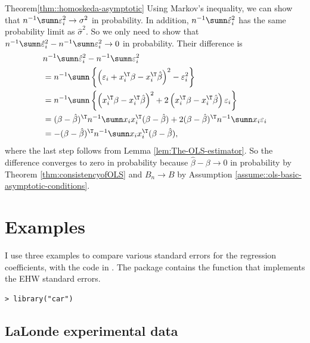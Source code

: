 \begin{myproof}{Theorem}{\ref{thm::homoskeda-asymptotic}}
Using Markov's inequality, we can show that $n^{-1}\sumn\varepsilon_{i}^{2}\rightarrow\sigma^{2}$ 
in probability. In addition, $n^{-1}\sumn\hat{\varepsilon}_{i}^{2}$ has the
same probability limit as $\hat{\sigma}^{2}$. So we only need to
show that $n^{-1}\sumn\hat{\varepsilon}_{i}^{2}-n^{-1}\sumn\varepsilon_{i}^{2}\rightarrow0$
in probability. Their difference is
\begin{align*}
&n^{-1}\sumn\hat{\varepsilon}_{i}^{2}-n^{-1}\sumn\varepsilon_{i}^{2} \\
& =n^{-1}\sumn\left\{ \left(\varepsilon_{i}+x_{i}^{\T}\beta-x_{i}^{\T}\hat{\beta}\right)^{2}-\varepsilon_{i}^{2}\right\} \\
 & =n^{-1}\sumn\left\{ \left(x_{i}^{\T}\beta-x_{i}^{\T}\hat{\beta}\right)^{2}+2\left(x_{i}^{\T}\beta-x_{i}^{\T}\hat{\beta}\right)\varepsilon_{i}\right\} \\
 & =(\beta-\hat{\beta})^{\T}n^{-1}\sumn x_{i}x_{i}^{\T}(\beta-\hat{\beta})+2(\beta-\hat{\beta})^{\T}n^{-1}\sumn x_{i}\varepsilon_{i} 
 \\
 &= -(\beta-\hat{\beta})^{\T}n^{-1}\sumn x_{i}x_{i}^{\T}(\beta-\hat{\beta}),
\end{align*}
where the last step follows from Lemma \ref{lem:The-OLS-estimator}. So the difference converges to zero in probability because $\hat{\beta}-\beta\rightarrow0$
in probability by Theorem \ref{thm:consistencyofOLS} and $B_{n}\rightarrow B$ by Assumption \ref{assume::ols-basic-asymptotic-conditions}. 
\end{myproof}
%





\section{Examples}


I use three examples to compare various standard errors for the regression coefficients, with the  code in . The  package contains the  function that implements the EHW standard errors.  

\begin{lstlisting}
> library("car")
\end{lstlisting}


\subsection{LaLonde experimental data}

